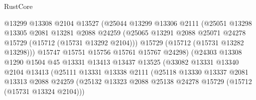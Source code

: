 \begin{lexlean}{RustCore}
\begin{coremodule}
                              @13299
                              @13308
                              @2104
                              @13527
                              (@25044
                                @13299
                                @13306
                                @2111
                                (@25051
                                  @13298
                                  @13305
                                  @2081
                                  @13281
                                  @2088
                                  @24259
                                  (@25065
                                    @13291
                                    @2088
                                    @25071
                                    @24278
                                    @15729
                                    (@15712 (@15731 @13292 @2104)))
                                  @15729
                                  (@15712 (@15731 @13282 @13298)))
                                @15747
                                @15751
                                @15756
                                @15761
                                @15767
                                @24298)
                              (@24303
                                @13308
                                @1290
                                @1504
                                @45
                                @13331
                                @13413
                                @13437
                                @13525
                                (@33082
                                  @13331
                                  @13340
                                  @2104
                                  @13413
                                  (@25111
                                    @13331
                                    @13338
                                    @2111
                                    (@25118
                                      @13330
                                      @13337
                                      @2081
                                      @13313
                                      @2088
                                      @24259
                                      (@25132
                                        @13323
                                        @2088
                                        @25138
                                        @24278
                                        @15729
                                        (@15712 (@15731 @13324 @2104)))

\end{coremodule}
\end{lexlean}
